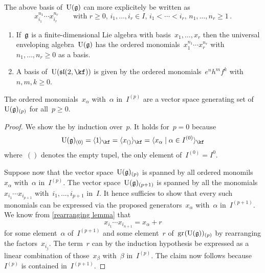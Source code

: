 \begin{remark}
  The above basis of~$\operatorname{U}(\mathfrak{g})$ can more explicitely be written as
  \[
    x_{i_1}^{n_1} \dotsm x_{i_r}^{n_r}
    \qquad
    \text{with~$r \geq 0$,~$i_1, \dotsc, i_r \in I$,~$i_1 < \dotsb < i_r$,~$n_1, \dotsc, n_r \geq 1$} \,.
  \]
\end{remark}


\begin{example}
  \leavevmode
  \begin{enumerate}
    \item
      If~$\mathfrak{g}$ is a finite-dimensional Lie algebra with basis~$x_1, \dotsc, x_r$ then the universal enveloping algebra~$\operatorname{U}(\mathfrak{g})$ has the ordered monomials~$x_1^{n_1} \dotsm x_r^{n_r}$ with~$n_1, \dotsc, n_r \geq 0$ as a basis.
    \item
      A basis of~$\Univ(\sllie(2, \kf))$ is given by the ordered monomials~$e^n h^m f^k$ with~$n, m, k \geq 0$.
  \end{enumerate}
\end{example}


\begin{lemma}
  \label{pbw concrete generating part filtered part}
  The ordered monomials~$x_\alpha$ with~$\alpha$ in~$I^{(p)}$ are a vector space generating set of~$\operatorname{U}(\mathfrak{g})_{(p)}$ for all~$p \geq 0$.
\end{lemma}


\begin{proof}
  We show the  by induction over~$p$.
  It holds for~$p = 0$ because
  \[
    \Univ(\glie)_{(0)}
    =
    \gen{ 1 }_{\kf}
    =
    \gen{ x_{()} }_{\kf}
    =
    \gen{ x_\alpha \suchthat \alpha \in I^{(0)} }_{\kf}
  \]
  where~$()$ denotes the empty tupel, the only element of~$I^{(0)} = I^{0}$.
  
  Suppose now that the vector space~$\operatorname{U}(\mathfrak{g})_{(p)}$ is spanned by all ordered monomils~$x_\alpha$ with~$\alpha$ in~$I^{(p)}$.
  The vector space~$\operatorname{U}(\mathfrak{g})_{(p+1)}$ is spanned by all the monomials~$x_{i_1} \dotsm x_{i_{p+1}}$ with~$i_1, \dotsc, i_{p+1}$ in~$I$.
  It hence sufficies to show that every such monomials can be expressed via the proposed generators~$x_\alpha$ with~$\alpha$ in~$I^{(p+1)}$.
  We know from \cref{rearranging lemma} that
  \[
    x_{i_1} \dotsm x_{i_{n+1}}
    =
    x_\alpha + r
  \]
  for some element~$\alpha$ of~$I^{(p+1)}$ and some element~$r$ of~$\gr(\Univ(\glie))_{(p)}$ by rearranging the factors~$x_{i_j}$.
  The term~$r$ can by the induction hypothesis be expressed as a linear combination of those~$x_\beta$ with~$\beta$ in~$I^{(p)}$.
  The claim now follows because~$I^{(p)}$ is contained in~$I^{(p+1)}$.
\end{proof}


